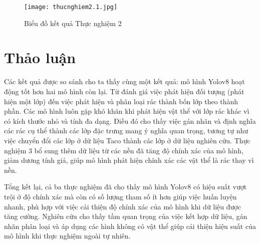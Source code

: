 \documentclass[../the.tex]{subfiles}
\begin{document}
\begin{figure}[H]
    \centering
    \texttt{[image: thucnghiem2.1.jpg]}
    \caption{Biểu đồ kết quả Thực nghiệm 2}
    \label{fig:thucnghiem3}
\end{figure}


\section{Thảo luận} 
{\fontsize{13}{12} \selectfont 
Các kết quả được so sánh cho ta thấy cùng một kết quả: mô hình Yolov8 hoạt động tốt hơn hai mô hình còn lại.
Từ đánh giá việc phát hiện đối tượng (phát hiện một lớp) đến việc phát hiện và phân loại rác thành bốn lớp theo thành phần.
Các mô hình luôn gặp khó khăn khi phát hiện vật thể với lớp rác khác vì có kích thước nhỏ và tính đa dạng. 
Điều đó cho thấy việc gán nhãn và định nghĩa các rác cụ thể thành các lớp đặc trưng mang ý nghĩa quan trọng,
tương tự như việc chuyển đổi các lớp ở dữ liệu Taco thành các lớp ở dữ liệu nghiên cứu. 
Thực nghiệm 3 bổ sung thêm dữ liệu từ các nền đã tăng độ chính xác của mô hình, giảm dương tính giả, giúp mô hình phát hiện chính xác các vật thể là rác thay vì nền.
}

\bigskip

{\fontsize{13}{12} \selectfont 
Tổng kết lại, cả ba thực nghiệm đã cho thấy mô hình Yolov8 có hiệu suất vượt trội ở độ chính xác 
mà còn có số lượng tham số ít hơn giúp việc huấn luyện nhanh, phù hợp với việc cải thiện độ chính xác của mô hình khi dữ liệu được tăng cường.
Nghiên cứu cho thấy tầm quan trọng của việc kết hợp dữ liệu, gán nhãn phân loại và áp dụng các hình không có vật thể giúp cải thiện hiệu suất của mô hình khi thực nghiệm ngoài tự nhiên.

}
\end{document}

